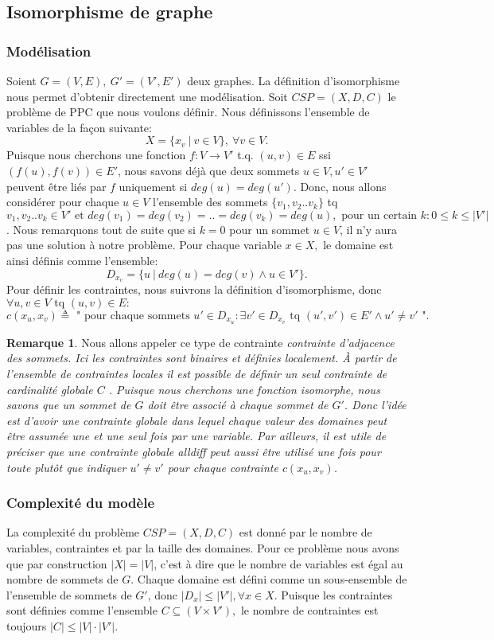 \documentclass[french]{article}
\theoremstyle{definition}
\newtheorem{rem}{Remarque}[section]
\theoremstyle{remark}
\begin{document}
\subsection{Isomorphisme de graphe}
\subsubsection{Modélisation}
\label{sssec:model1}
Soient $G=(V, E),\ G'=(V', E')$ deux graphes. 
La définition d'isomorphisme nous permet d'obtenir directement une modélisation. Soit $CSP = (X, D, C)$ le problème de PPC que nous voulons définir. Nous définissons l'ensemble de variables de la façon suivante: 
$$X=\{x_v\ |\ v \in V \},\ \forall v \in V.$$
Puisque nous cherchons une fonction  $f: V \rightarrow V'$ t.q. $ (u,v) \in E$ ssi $ (f(u), f(v)) \in E'$, nous savons déjà que deux sommets $u \in V, u' \in V'$ peuvent être liés par $f$ uniquement si $deg(u) = deg(u')$. Donc, nous allons considérer pour chaque $u \in V$ l'ensemble des sommets $\{v_1, v_2..v_k\}$ tq $v_1, v_2..v_k \in V' \text{ et } deg(v_1)=deg(v_2)=..=deg(v_k)=deg(u), \text{ pour un certain } k: 0 \leq k \leq |V'|$. Nous remarquons tout de suite que si $k=0$ pour un sommet $u \in V$, il n'y aura pas une solution à notre problème. Pour chaque variable $x \in X,$ le domaine est ainsi définis comme l'ensemble: 
$$D_{x_v}=\{u\ |\ deg(u) = deg(v) \land u \in V'\}.$$
Pour définir les contraintes, nous suivrons la définition d'isomorphisme, donc $\forall u, v \in V \text{ tq } (u,v) \in E:$
$$c(x_u, x_v) \triangleq \text{ " pour chaque sommets } u' \in D_{x_u}: \exists v' \in D_{x_v} \text{ tq } (u', v') \in E' \land u' \neq v' \text{ "}.$$
\begin{rem}
	\label{rem:contraintes}
	Nous allons appeler ce type de contrainte \it contrainte d'adjacence des sommets\rm. Ici les contraintes sont binaires et définies localement. À partir de l'ensemble de contraintes locales il est possible de définir un seul contrainte de cardinalité globale $C$ \cite{regin}. Puisque nous cherchons une fonction isomorphe, nous savons que un sommet de $G$ doit être associé à chaque sommet de $G'$. Donc l'idée est d'avoir une contrainte globale dans lequel chaque valeur des domaines peut être assumée une et une seul fois par une variable.
	Par ailleurs, il est utile de préciser que une contrainte globale \it alldiff \rm peut aussi être utilisé une fois pour toute plutôt que indiquer $u' \neq v'$ pour chaque contrainte $c(x_u, x_v)$.
\end{rem}
\subsubsection{Complexité du modèle}
\label{subsubsec:compl1}
La complexité du problème $CSP=(X,D,C)$ est donné par le nombre de variables, contraintes et par la taille des domaines. Pour ce problème nous avons que par construction $|X|=|V|$, c'est à dire que le nombre de variables est égal au nombre de sommets de $G$. Chaque domaine est défini comme un sous-ensemble de l'ensemble de sommets de $G'$, donc $|D_x| \leq |V'|, \forall x \in X.$ Puisque les contraintes sont définies comme l'ensemble $C \subseteq (V \times V'),$ le nombre de contraintes est toujours $|C| \leq |V| \cdot |V'|.$
\end{document}
